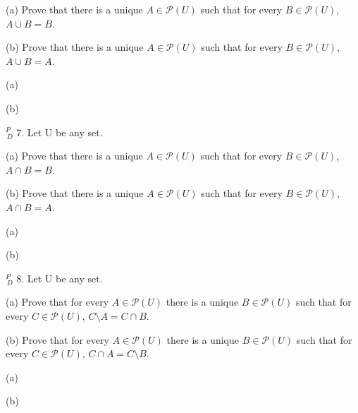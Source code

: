 \documentclass{article}
\begin{document}
\hspace{12pt}(a) Prove that there is a unique $A \in \mathcal{P} (U)$ such that for every $B \in \mathcal{P} (U)$, $A \cup B = B$.

\hspace{12pt}(b) Prove that there is a unique $A \in \mathcal{P} (U)$ such that for every $B \in \mathcal{P} (U)$, $A \cup B = A$.

\vspace{30pt}

(a)

\vspace{30pt}

(b)

\vspace{30pt}

$^{\textit{P}}_{\, \textit{D}}$ 7. Let U be any set.

\hspace{12pt}(a) Prove that there is a unique $A \in \mathcal{P} (U)$ such that for every $B \in \mathcal{P} (U)$, $A \cap B = B$.

\hspace{12pt}(b) Prove that there is a unique $A \in \mathcal{P} (U)$ such that for every $B \in
\mathcal{P} (U)$, $A \cap B = A$.

\vspace{30pt}

(a)

\vspace{30pt}

(b)

\vspace{30pt}

$^{\textit{P}}_{\, \textit{D}}$ 8. Let U be any set.

\hspace{12pt}(a) Prove that for every $A \in \mathcal{P} (U)$ there is a unique $B \in \mathcal{P} (U)$ such
that for every $C \in \mathcal{P} (U)$, $C \setminus A = C \cap B$.

\hspace{12pt}(b) Prove that for every $A \in \mathcal{P} (U)$ there is a unique $B \in \mathcal{P} (U)$ such
that for every $C \in \mathcal{P} (U)$, $C \cap A = C \setminus B$.

\vspace{30pt}

(a)

\vspace{30pt}

(b)

\vspace{30pt}
\end{document}

